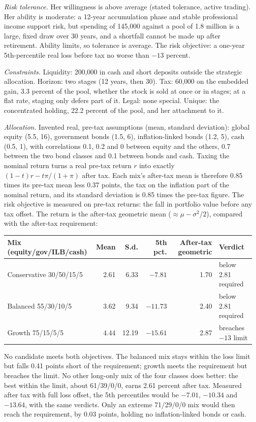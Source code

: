 \begin{qfexample}
\emph{Risk tolerance.} Her willingness is above average (stated tolerance, active trading). Her ability is moderate: a 12-year accumulation phase and stable professional income support risk, but spending of 145{,}000 against a pool of 1.8 million is a large, fixed draw over 30 years, and a shortfall cannot be made up after retirement. Ability limits, so tolerance is average. The risk objective: a one-year 5th-percentile real loss before tax no worse than $-13$ percent.

\emph{Constraints.} Liquidity: 200{,}000 in cash and short deposits outside the strategic allocation. Horizon: two stages (12 years, then 30). Tax: 60{,}000 on the embedded gain, 3.3 percent of the pool, whether the stock is sold at once or in stages; at a flat rate, staging only defers part of it. Legal: none special. Unique: the concentrated holding, 22.2 percent of the pool, and her attachment to it.

\emph{Allocation.} Invented real, pre-tax assumptions (mean, standard deviation): global equity (5.5, 16), government bonds (1.5, 6), inflation-linked bonds (1.2, 5), cash (0.5, 1), with correlations 0.1, 0.2 and 0 between equity and the others, 0.7 between the two bond classes and 0.1 between bonds and cash. Taxing the nominal return turns a real pre-tax return $r$ into exactly $(1-t)r-t\pi/(1+\pi)$ after tax. Each mix's after-tax mean is therefore 0.85 times its pre-tax mean less 0.37 points, the tax on the inflation part of the nominal return, and its standard deviation is 0.85 times the pre-tax figure. The risk objective is measured on pre-tax returns: the fall in portfolio value before any tax offset. The return is the after-tax geometric mean ($\approx\mu-\sigma^2/2$), compared with the after-tax requirement:
\begin{center}\small
\begin{tabular}{@{}lrrrrl@{}}
\toprule
Mix (equity/gov/ILB/cash) & Mean & S.d. & 5th pct. & After-tax geometric & Verdict \\
\midrule
Conservative 30/50/15/5 & 2.61 & 6.33 & $-7.81$ & 1.70 & below 2.81 required \\
Balanced 55/30/10/5 & 3.62 & 9.34 & $-11.73$ & 2.40 & below 2.81 required \\
Growth 75/15/5/5 & 4.44 & 12.19 & $-15.61$ & 2.87 & breaches $-13$ limit \\
\bottomrule
\end{tabular}
\end{center}
No candidate meets both objectives. The balanced mix stays within the loss limit but falls 0.41 points short of the requirement; growth meets the requirement but breaches the limit. No other long-only mix of the four classes does better: the best within the limit, about 61/39/0/0, earns 2.61 percent after tax. Measured after tax with full loss offset, the 5th percentiles would be $-7.01$, $-10.34$ and $-13.64$, with the same verdicts. Only an extreme 71/29/0/0 mix would then reach the requirement, by 0.03 points, holding no inflation-linked bonds or cash.


\end{qfexample}
